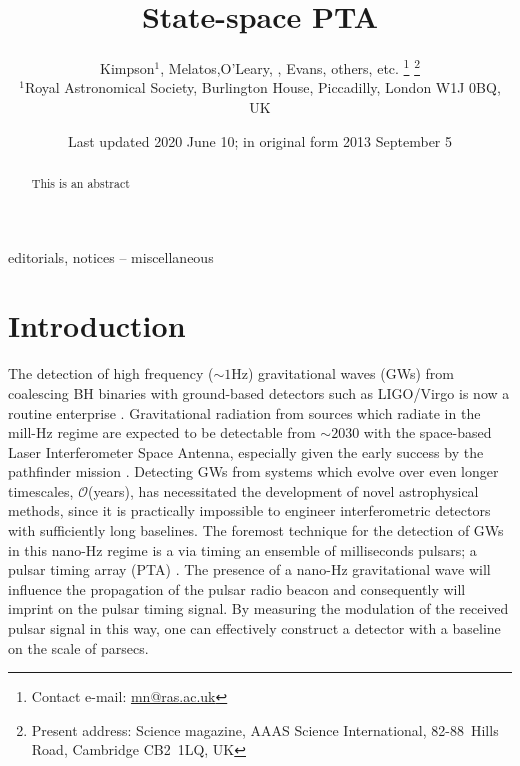 \documentclass[fleqn,usenatbib,useAMS]{mnras}
\title[Kalman PTA]{State-space PTA}
\author[Kimpson]{Kimpson$^{1}$, Melatos,O'Leary, , Evans, others, etc. %
\thanks{Contact e-mail: \href{mailto:mn@ras.ac.uk}{mn@ras.ac.uk}}%
\thanks{Present address: Science magazine, AAAS Science International, \mbox{82-88}~Hills Road, Cambridge CB2~1LQ, UK}%
\\
$^{1}$Royal Astronomical Society, Burlington House, Piccadilly, London W1J 0BQ, UK}
\date{Last updated 2020 June 10; in original form 2013 September 5}
\begin{document}
\label{firstpage}
\pagerange{\pageref{firstpage}--\pageref{lastpage}}
\maketitle

\begin{abstract}
This is an abstract
\end{abstract}

\begin{keywords}
editorials, notices -- miscellaneous
\end{keywords}



\begingroup
\let\clearpage\relax
\endgroup
\newpage

\section{Introduction}



The detection of high frequency ($\sim 1$Hz) gravitational waves (GWs) from coalescing BH binaries with ground-based detectors such as LIGO/Virgo \citep{aLIGO,2015CQGra..32b4001A} is now a routine enterprise \citep[e.g.][]{2019PhRvX...9c1040A,2021PhRvX..11b1053A}. Gravitational radiation from sources which radiate in the mill-Hz regime are expected to be detectable from $\sim 2030$ with the space-based Laser Interferometer Space Antenna, \citep{LISApaper} especially given the early success by the pathfinder mission \citep{2019arXiv190308924A}. Detecting GWs from systems which evolve over even longer timescales, $\mathcal{O}$(years), has necessitated the development of novel astrophysical methods, since it is practically impossible to engineer interferometric detectors with sufficiently long baselines. The foremost technique for the detection of GWs in this nano-Hz regime is a via timing an ensemble of milliseconds pulsars; a pulsar timing array (PTA) \citep{2021hgwa.bookE...4V}. The presence  of a nano-Hz gravitational wave will influence the propagation of the pulsar radio beacon and consequently will imprint on the pulsar timing signal. By measuring the modulation of the received pulsar signal in this way, one can effectively construct a detector with a baseline on the scale of parsecs. \newline 
\end{document}
